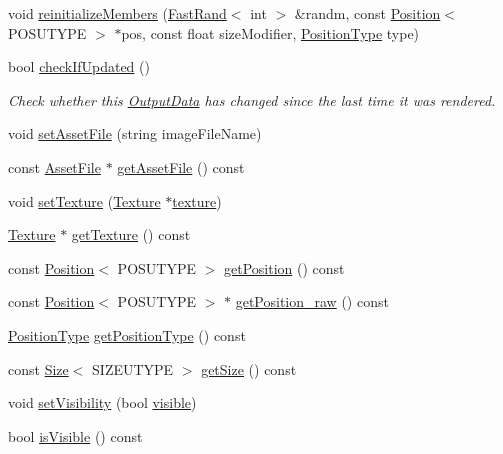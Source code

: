 \begin{DoxyCompactItemize}
\item 
void \hyperlink{struct_output_data_a6cdf1d5f73c6ac03a2b46ce65d01c870}{reinitialize\-Members} (\hyperlink{class_fast_rand}{Fast\-Rand}$<$ int $>$ \&randm, const \hyperlink{struct_position}{Position}$<$ P\-O\-S\-U\-T\-Y\-P\-E $>$ $\ast$pos, const float size\-Modifier, \hyperlink{_output_data_8hpp_aa80fe4e9a559009407475c9587214b48}{Position\-Type} type)
\item 
bool \hyperlink{struct_output_data_a2b19b9cd0df099c3f923f9c5f1ef28d9}{check\-If\-Updated} ()
\begin{DoxyCompactList}\small\item\em Check whether this \hyperlink{struct_output_data}{Output\-Data} has changed since the last time it was rendered. \end{DoxyCompactList}\item 
void \hyperlink{struct_output_data_a43ba11266165462930555fce963d20d9}{set\-Asset\-File} (string image\-File\-Name)
\item 
const \hyperlink{struct_asset_file}{Asset\-File} $\ast$ \hyperlink{struct_output_data_aa098f57388970d839d6eb55b333b1feb}{get\-Asset\-File} () const 
\item 
void \hyperlink{struct_output_data_a486ecf698661a03fd0740c83cd5ebe39}{set\-Texture} (\hyperlink{_default_config_8h_a9ca20d8445e7d830c262f5ec4bb5d1bf}{Texture} $\ast$\hyperlink{struct_output_data_af592125b9117db60d387049a7631c763}{texture})
\item 
\hyperlink{_default_config_8h_a9ca20d8445e7d830c262f5ec4bb5d1bf}{Texture} $\ast$ \hyperlink{struct_output_data_abae817843824525377ff87dff98825f1}{get\-Texture} () const 
\item 
const \hyperlink{struct_position}{Position}$<$ P\-O\-S\-U\-T\-Y\-P\-E $>$ \hyperlink{struct_output_data_acafb00ba35ee770e08f37de9080430a1}{get\-Position} () const 
\item 
const \hyperlink{struct_position}{Position}$<$ P\-O\-S\-U\-T\-Y\-P\-E $>$ $\ast$ \hyperlink{struct_output_data_a472127a33bcf404202ce9481a5ac8c4b}{get\-Position\-\_\-raw} () const 
\item 
\hyperlink{_output_data_8hpp_aa80fe4e9a559009407475c9587214b48}{Position\-Type} \hyperlink{struct_output_data_ae5a31a3636b1ebcebb70da1d8e2b5111}{get\-Position\-Type} () const 
\item 
const \hyperlink{struct_size}{Size}$<$ S\-I\-Z\-E\-U\-T\-Y\-P\-E $>$ \hyperlink{struct_output_data_a3bffb05a3714e4c93adb33bce30cc86d}{get\-Size} () const 
\item 
void \hyperlink{struct_output_data_a286c4b1e5d7abf94af4d9f5eb454100e}{set\-Visibility} (bool \hyperlink{struct_output_data_ab1d5abc732db0f826a01afbea44ada34}{visible})
\item 
bool \hyperlink{struct_output_data_aeaa3ed34010dfb0726897b9722a779fa}{is\-Visible} () const 
\end{DoxyCompactItemize}
